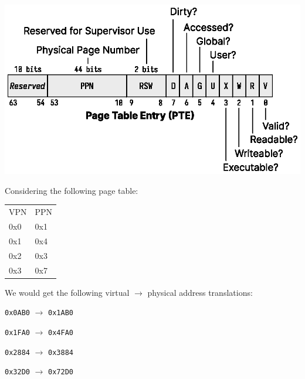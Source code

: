   \begin{slide}


    \begin{center}
      \includegraphics{pte.eps}
    \end{center}

  \end{slide}

  \begin{slide}


    Considering the following page table:
    \begin{center}
    {\ttfamily
    \begin{tabular}{ll}
      VPN  & PPN  \\
      0x0 & 0x1 \\
      0x1 & 0x4 \\
      0x2 & 0x3 \\
      0x3 & 0x7 \\
    \end{tabular}}
    \end{center}
    \medskip

    We would get the following virtual $\rightarrow$ physical address translations:
    \begin{center}
    \texttt{0x0AB0} $\rightarrow$ \texttt{0x1AB0}

    \texttt{0x1FA0} $\rightarrow$ \texttt{0x4FA0}

    \texttt{0x2884} $\rightarrow$ \texttt{0x3884}

    \texttt{0x32D0} $\rightarrow$ \texttt{0x72D0}
    \end{center}

  \end{slide}

